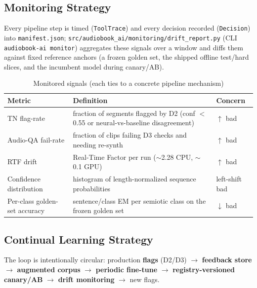 \documentclass[12pt,a4paper]{article}
\begin{document}
\subsection{Monitoring Strategy}

Every pipeline step is timed (\texttt{ToolTrace}) and every decision recorded (\texttt{Decision}) into \texttt{manifest.json}; \texttt{src/audiobook\_ai/monitoring/drift\_report.py} (CLI \texttt{audiobook-ai monitor}) aggregates these signals over a window and diffs them against fixed reference anchors (a frozen golden set, the shipped offline test/hard slices, and the incumbent model during canary/AB).

\begin{table}[H]
\centering
\caption{Monitored signals (each ties to a concrete pipeline mechanism)}
\small
\begin{tabularx}{\linewidth}{@{} l L l @{}}
\toprule
\textbf{Metric} & \textbf{Definition} & \textbf{Concern} \\
\midrule
TN flag-rate & fraction of segments flagged by D2 (conf $<$0.55 or neural-vs-baseline disagreement) & $\uparrow$ bad \\
Audio-QA fail-rate & fraction of clips failing D3 checks and needing re-synth & $\uparrow$ bad \\
RTF drift & Real-Time Factor per run ($\sim$2.28 CPU, $\sim$0.1 GPU) & $\uparrow$ bad \\
Confidence distribution & histogram of length-normalized sequence probabilities & left-shift bad \\
Per-class golden-set accuracy & sentence/class EM per semiotic class on the frozen golden set & $\downarrow$ bad \\
\bottomrule
\end{tabularx}
\end{table}

\subsection{Continual Learning Strategy}

The loop is intentionally circular: production \textbf{flags} (D2/D3) $\rightarrow$ \textbf{feedback store} $\rightarrow$ \textbf{augmented corpus} $\rightarrow$ \textbf{periodic fine-tune} $\rightarrow$ \textbf{registry-versioned canary/AB} $\rightarrow$ \textbf{drift monitoring} $\rightarrow$ new flags.
\end{document}
